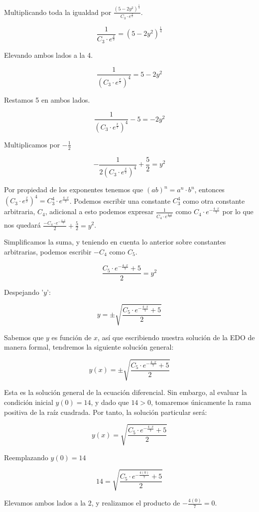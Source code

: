 \documentclass{article}
\begin{document}
Multiplicando toda la igualdad por \(\frac{(5-2y^2)^{\frac{1}{4}}}{C_3\cdot e^{\frac{x}{7}}}\).

\[
 \frac{1}{C_3\cdot e^{\frac{x}{7}}}= (5-2y^2)^{\frac{1}{4}}
\]

Elevando ambos lados a la 4.

\[
 \frac{1}{(C_3\cdot e^{\frac{x}{7}})^{4}}=5-2y^2
\]

Restamos 5 en ambos lados.

\[
 \frac{1}{(C_3\cdot e^{\frac{x}{7}})^{4}}-5=-2y^2
\]

Multiplicamos por \(-\frac{1}{2}\)

\[
 -\frac{1}{2(C_3\cdot e^{\frac{x}{7}})^{4}}+\frac{5}{2}=y^2
\]

Por propiedad de los exponentes tenemos que \((ab)^n=a^n\cdot b^n\), entonces \((C_3\cdot e^{\frac{x}{7}})^{4}=C_3^4\cdot e^{\frac{4\cdot x}{7}}\). Podemos escribir una constante \(C_3^4\) como otra constante arbitraria, \(C_4\), adicional a esto podemos expresar \(\frac{1}{C_4\cdot e^{\frac{4\cdot x}{7}}}\) como \(C_4\cdot e^{-\frac{4\cdot x}{7}}\) por lo que nos quedará \(\frac{-C_4\cdot e^{-\frac{4\cdot x}{7}}}{2}+\frac{5}{2}=y^2\).

Simplificamos la suma, y teniendo en cuenta lo anterior sobre constantes arbitrarias, podemos escribir \(-C_4\) como \(C_5\).

\[
 \frac{C_5\cdot e^{-\frac{4\cdot x}{7}}+5}{2}=y^2
\]

Despejando '\(y\)':

\[
 y =\pm\sqrt{\frac{C_5\cdot e^{-\frac{4\cdot x}{7}}+5}{2}}
\]

Sabemos que \(y\) es función de \(x\), así que escribiendo nuestra solución de la EDO de manera formal, tendremos la siguiente solución general:

\[
 y(x) =\pm\sqrt{\frac{C_5\cdot e^{-\frac{4\cdot x}{7}}+5}{2}}
\]

Esta es la solución general de la ecuación diferencial. Sin embargo, al evaluar la condición inicial \(y(0) = 14\), y dado que \(14 > 0\), tomaremos únicamente la rama positiva de la raíz cuadrada. Por tanto, la solución particular será:

\[
 y(x) = \sqrt{\frac{C_5\cdot e^{-\frac{4\cdot x}{7}}+5}{2}}
\]

Reemplazando \(y(0)=14\)

\[
 14=\sqrt{\frac{C_5\cdot e^{-\frac{4(0)}{7}}+5}{2}}
\] 

Elevamos ambos lados a la 2, y realizamos el producto de \(-\frac{4(0)}{7}=0\).
\end{document}
